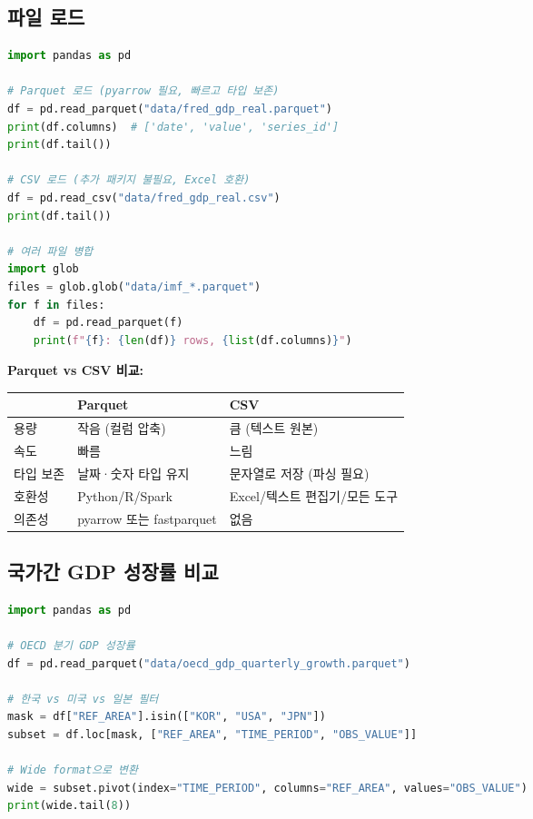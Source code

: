 \documentclass[11pt,a4paper]{article}
\begin{document}
\subsection{파일 로드}

\begin{lstlisting}[language=Python]
import pandas as pd

# Parquet 로드 (pyarrow 필요, 빠르고 타입 보존)
df = pd.read_parquet("data/fred_gdp_real.parquet")
print(df.columns)  # ['date', 'value', 'series_id']
print(df.tail())

# CSV 로드 (추가 패키지 불필요, Excel 호환)
df = pd.read_csv("data/fred_gdp_real.csv")
print(df.tail())

# 여러 파일 병합
import glob
files = glob.glob("data/imf_*.parquet")
for f in files:
    df = pd.read_parquet(f)
    print(f"{f}: {len(df)} rows, {list(df.columns)}")
\end{lstlisting}

\textbf{Parquet vs CSV 비교:}
\begin{table}[h]
\centering
\begin{tabularx}{\textwidth}{l X X}
\toprule
& \textbf{Parquet} & \textbf{CSV} \\
\midrule
용량     & 작음 (컬럼 압축)         & 큼 (텍스트 원본) \\
속도     & 빠름                     & 느림 \\
타입 보존 & 날짜·숫자 타입 유지       & 문자열로 저장 (파싱 필요) \\
호환성   & Python/R/Spark           & Excel/텍스트 편집기/모든 도구 \\
의존성   & pyarrow 또는 fastparquet & 없음 \\
\bottomrule
\end{tabularx}
\end{table}

\subsection{국가간 GDP 성장률 비교}

\begin{lstlisting}[language=Python]
import pandas as pd

# OECD 분기 GDP 성장률
df = pd.read_parquet("data/oecd_gdp_quarterly_growth.parquet")

# 한국 vs 미국 vs 일본 필터
mask = df["REF_AREA"].isin(["KOR", "USA", "JPN"])
subset = df.loc[mask, ["REF_AREA", "TIME_PERIOD", "OBS_VALUE"]]

# Wide format으로 변환
wide = subset.pivot(index="TIME_PERIOD", columns="REF_AREA", values="OBS_VALUE")
print(wide.tail(8))
\end{lstlisting}
\end{document}
